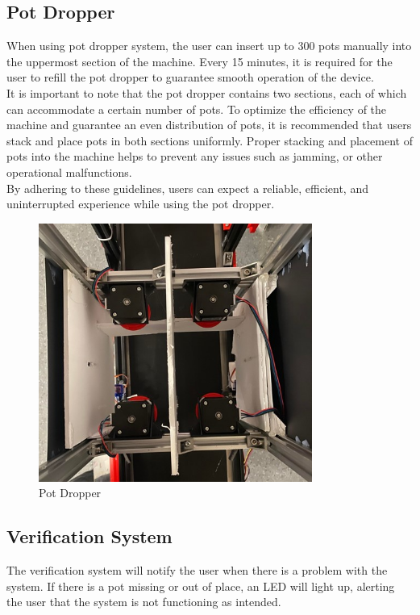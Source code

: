 \documentclass[12pt, titlepage]{article}
\begin{document}
\subsection{Pot Dropper}
When using pot dropper system, the user can insert up to 300 pots manually into the uppermost section of the machine. Every 15 minutes, it is required for the user to refill the pot dropper to guarantee smooth operation of the device.
\\
\noindent It is important to note that the pot dropper contains two sections, each of which can accommodate a certain number of pots. To optimize the efficiency of the machine and guarantee an even distribution of pots, it is recommended that users stack and place pots in both sections uniformly. Proper stacking and placement of pots into the machine helps to prevent any issues such as jamming, or other operational malfunctions.
\\
\noindent By adhering to these guidelines, users can expect a reliable, efficient, and uninterrupted experience while using the pot dropper.

\begin{figure}[H]
    \centering
    \includegraphics[width=0.8\textwidth]{pot.jpg}
    \caption{Pot Dropper}
    \label{fig:scope}
  \end{figure}
\newpage
\subsection{Verification System}
The verification system will notify the user when there is a problem with the system. If there is a pot missing or out of place, an LED will light up, alerting the user that the system is not functioning as intended. 
\end{document}
